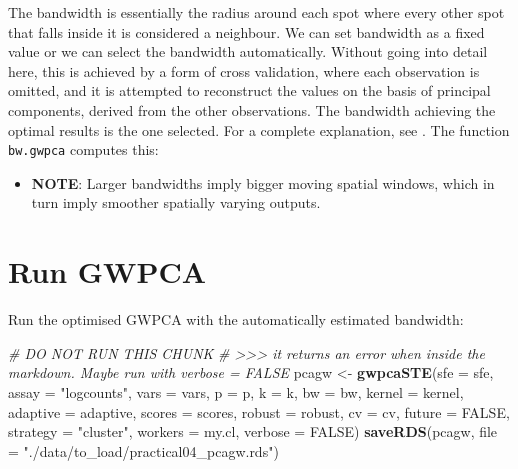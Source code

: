 \documentclass[
]{book}
\newenvironment{Shaded}{\begin{snugshade}}{\end{snugshade}}
\newcommand{\AttributeTok}[1]{\textcolor[rgb]{0.13,0.29,0.53}{#1}}
\newcommand{\CommentTok}[1]{\textcolor[rgb]{0.56,0.35,0.01}{\textit{#1}}}
\newcommand{\ConstantTok}[1]{\textcolor[rgb]{0.56,0.35,0.01}{#1}}
\newcommand{\FunctionTok}[1]{\textcolor[rgb]{0.13,0.29,0.53}{\textbf{#1}}}
\newcommand{\NormalTok}[1]{#1}
\newcommand{\OtherTok}[1]{\textcolor[rgb]{0.56,0.35,0.01}{#1}}
\newcommand{\StringTok}[1]{\textcolor[rgb]{0.31,0.60,0.02}{#1}}
\providecommand{\tightlist}{%
  \setlength{\itemsep}{0pt}\setlength{\parskip}{0pt}}
\begin{document}
The bandwidth is essentially the radius around each spot where every other spot that falls inside it is considered a neighbour. We can set bandwidth as a fixed value or we can select the bandwidth automatically. Without going into detail here, this is achieved by a form of cross validation, where each observation is omitted, and it is attempted to reconstruct the values on the basis of principal components, derived from the other observations. The bandwidth achieving the optimal results is the one selected. For a complete explanation, see \citet{Harris2011Oct}. The function \texttt{bw.gwpca} computes this:

\begin{itemize}
\tightlist
\item
  \textbf{NOTE}: Larger bandwidths imply bigger moving spatial windows, which in turn imply smoother spatially varying outputs.
\end{itemize}

\hypertarget{run-gwpca}{%
\section{Run GWPCA}\label{run-gwpca}}

Run the optimised GWPCA with the automatically estimated bandwidth:

\begin{Shaded}
\begin{Highlighting}[]
\CommentTok{\# DO NOT RUN THIS CHUNK}
\CommentTok{\# \textgreater{}\textgreater{}\textgreater{} it returns an error when inside the markdown. Maybe run with verbose = FALSE}
\NormalTok{pcagw }\OtherTok{\textless{}{-}} \FunctionTok{gwpcaSTE}\NormalTok{(}\AttributeTok{sfe =}\NormalTok{ sfe, }
                  \AttributeTok{assay =} \StringTok{"logcounts"}\NormalTok{,}
                  \AttributeTok{vars =}\NormalTok{ vars, }
                  \AttributeTok{p =}\NormalTok{ p, }
                  \AttributeTok{k =}\NormalTok{ k, }
                  \AttributeTok{bw =}\NormalTok{ bw, }
                  \AttributeTok{kernel =}\NormalTok{ kernel,}
                  \AttributeTok{adaptive =}\NormalTok{ adaptive, }
                  \AttributeTok{scores =}\NormalTok{ scores, }
                  \AttributeTok{robust =}\NormalTok{ robust,}
                  \AttributeTok{cv =}\NormalTok{ cv,}
                  \AttributeTok{future =} \ConstantTok{FALSE}\NormalTok{,}
                  \AttributeTok{strategy =} \StringTok{"cluster"}\NormalTok{,}
                  \AttributeTok{workers =}\NormalTok{ my.cl,}
                  \AttributeTok{verbose =} \ConstantTok{FALSE}\NormalTok{)}
\FunctionTok{saveRDS}\NormalTok{(pcagw, }\AttributeTok{file =} \StringTok{"./data/to\_load/practical04\_pcagw.rds"}\NormalTok{)}
\end{Highlighting}
\end{Shaded}
\end{document}
